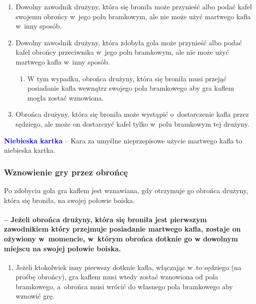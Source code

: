\documentclass[12pt,a4paper]{article}
\newcommand\bluecard[1]{\bgroup\textcolor{blue}{\textbf{#1}}}
\begin{document}
\begin{enumerate}
	\item
	      Dowolny zawodnik drużyny, która się broniła może przynieść albo podać
	      kafel swojemu obrońcy w~jego polu bramkowym, ale nie może użyć
	      martwego kafla w~inny sposób.
	\item
	      Dowolny zawodnik drużyny, która zdobyła gola może przynieść albo podać
	      kafel obrońcy przeciwnika w~jego polu bramkowym, ale nie może użyć
	      martwego kafla w~inny sposób.

	      \begin{enumerate}
		      \item
		            W tym wypadku, obrońca drużyny, która się broniła musi przejąć
		            posiadanie kafla wewnątrz swojego pola bramkowego aby gra kaflem
		            mogła zostać wznowiona.
	      \end{enumerate}
	\item
	      Obrońca drużyny, która się broniła może wystąpić o~dostarczenie kafla
	      przez sędziego, ale może on dostarczyć kafel tylko w~polu bramkowym
	      tej drużyny.
\end{enumerate}

\bluecard{Niebieska kartka} -- Kara za umyślne nieprzepisowe użycie martwego
kafla to niebieska kartka.

\subsubsection{Wznowienie gry przez obrońcę}
Po zdobyciu gola gra
kaflem jest wznawiana, gdy otrzymuje go obrońca drużyny, która się
broniła, na swojej połowie boiska.

\paragraph{ -- Jeżeli obrońca drużyny, która się broniła jest
	pierwszym zawodnikiem który przejmuje posiadanie martwego kafla, zostaje
	on ożywiony w~momencie, w~którym obrońca dotknie go w dowolnym miejscu
	na swojej połowie boiska.}

\begin{enumerate}
	\item
	      Jeżeli ktokolwiek inny pierwszy dotknie kafla, włączając w~to sędziego
	      (na prośbę obrońcy), gra kaflem musi wtedy zostać wznowiona od pola
	      bramkowego, a~obrońca musi wrócić do własnego pola bramkowego aby
	      wznowić grę.
\end{enumerate}
\end{document}
